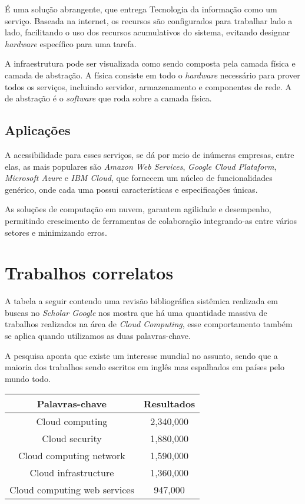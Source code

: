 \documentclass[12pt]{article}
\begin{document}
É uma solução abrangente, que entrega Tecnologia da informação como um serviço. Baseada na internet, os recursos são configurados para trabalhar lado a lado, facilitando o uso dos recursos acumulativos do sistema, evitando designar \emph{hardware} específico para uma tarefa.

A infraestrutura pode ser visualizada como sendo composta pela camada física e camada de abstração. A física consiste em todo o \emph{hardware} necessário para prover todos os serviços, incluindo servidor, armazenamento e componentes de rede. A de abstração é o \emph{software} que roda sobre a camada física.

\subsection{Aplicações}

A acessibilidade para esses serviços, se dá por meio de inúmeras empresas, entre elas, as mais populares são \emph{Amazon Web Services}, \emph{Google Cloud Plataform}, \emph{Microsoft Azure} e \emph{IBM Cloud}, que fornecem um núcleo de funcionalidades genérico, onde cada uma possui características e especificações únicas.

As soluções de computação em nuvem, garantem agilidade e desempenho, permitindo crescimento de ferramentas de colaboração integrando-as entre vários setores e minimizando erros.

\section{Trabalhos correlatos}

A tabela a seguir contendo uma revisão bibliográfica sistêmica realizada em buscas no \emph{Scholar Google} nos mostra que há uma quantidade massiva de trabalhos realizados na área de \emph{Cloud Computing}, esse comportamento também se aplica quando utilizamos as duas palavras-chave.

A pesquisa aponta que existe um interesse mundial no assunto, sendo que a maioria dos trabalhos sendo escritos em inglês mas espalhados em países pelo mundo todo.

\begin{center}
    \begin{tabular}{ | c | c | }
    \hline
    Palavras-chave & Resultados \\ 
    \hline
    Cloud computing & 2,340,000 \\  
    \hline
    Cloud security & 1,880,000 \\
    \hline
    Cloud computing network & 1,590,000 \\
    \hline
    Cloud infrastructure & 1,360,000 \\
    \hline
    Cloud computing web services & 947,000 \\
    \hline
    \end{tabular}
\end{center}
\end{document}

